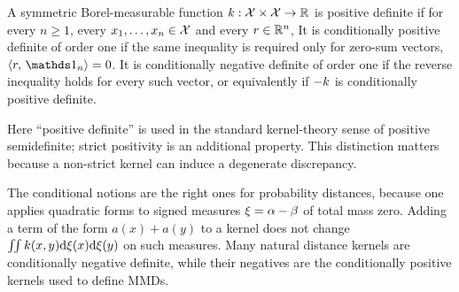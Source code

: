 \begin{defn}\label{def-positive-kernels}
	A symmetric Borel-measurable function $k:\mathcal{X}\times\mathcal{X}\to\mathbb{R}$ is positive definite if for every $n\geq1$, every $x_1,\ldots,x_n\in\mathcal{X}$ and every $r\in\mathbb{R}^n$,
	It is conditionally positive definite of order one if the same inequality is required only for zero-sum vectors, $\dotp{r}{\ones_n}=0$. It is conditionally negative definite of order one if the reverse inequality holds for every such vector, or equivalently if $-k$ is conditionally positive definite.
\end{defn}
Here ``positive definite'' is used in the standard kernel-theory sense of positive semidefinite; strict positivity is an additional property. This distinction matters because a non-strict kernel can induce a degenerate discrepancy.

The conditional notions are the right ones for probability distances, because one applies quadratic forms to signed measures $\xi=\alpha-\beta$ of total mass zero. Adding a term of the form $a(x)+a(y)$ to a kernel does not change $\iint k(x,y)\mathrm{d}\xi(x)\mathrm{d}\xi(y)$ on such measures. Many natural distance kernels are conditionally negative definite, while their negatives are the conditionally positive kernels used to define MMDs.

